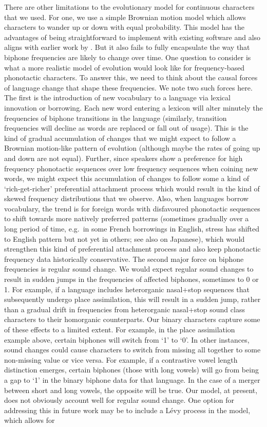 \documentclass[]{article}
\begin{document}
There are other limitations to the evolutionary model for continuous characters that we used. For one, we use a simple Brownian motion model which allows characters to wander up or down with equal probability. This model has the advantages of being straightforward to implement with existing software and also aligns with earlier work by \textcite{macklin-cordes_phylogenetic_2021}. But it also fails to fully encapsulate the way that biphone frequencies are likely to change over time. One question to consider is what a more realistic model of evolution would look like for frequency-based phonotactic characters. To answer this, we need to think about the causal forces of language change that shape these frequencies. We note two such forces here. The first is the introduction of new vocabulary to a language via lexical innovation or borrowing. Each new word entering a lexicon will alter minutely the frequencies of biphone transitions in the language (similarly, transition frequencies will decline as words are replaced or fall out of usage). This is the kind of gradual accumulation of changes that we might expect to follow a Brownian motion-like pattern of evolution (although maybe the rates of going up and down are not equal). Further, since speakers show a preference for high frequency phonotactic sequences over low frequency sequences when coining new words, we might expect this accumulation of changes to follow some a kind of `rich-get-richer' preferential attachment process which would result in the kind of skewed frequency distributions that we observe. Also, when languages borrow vocabulary, the trend is for foreign words with disfavoured phonotactic sequences to shift towards more natively preferred patterns (sometimes gradually over a long period of time, e.g.~in some French borrowings in English, stress has shifted to English pattern but not yet in others; see also \textcite{crawford_adaptation_2009} on Japanese), which would strengthen this kind of preferential attachment process and also keep phonotactic frequency data historically conservative. The second major force on biphone frequencies is regular sound change. We would expect regular sound changes to result in sudden jumps in the frequencies of affected biphones, sometimes to 0 or 1. For example, if a language includes heterorganic nasal+stop sequences that subsequently undergo place assimilation, this will result in a sudden jump, rather than a gradual drift in frequencies from heterorganic nasal+stop sound class characters to their homorganic counterparts. Our binary characters capture some of these effects to a limited extent. For example, in the place assimilation example above, certain biphones will switch from `1' to `0'. In other instances, sound changes could cause characters to switch from missing all together to some non-missing value or vice versa. For example, if a contrastive vowel length distinction emerges, certain biphones (those with long vowels) will go from being a gap to `1' in the binary biphone data for that language. In the case of a merger between short and long vowels, the opposite will be true. Our model, at present, does not obviously account well for regular sound change. One option for addressing this in future work may be to include a Lévy process in the model, which allows for 
\end{document}
